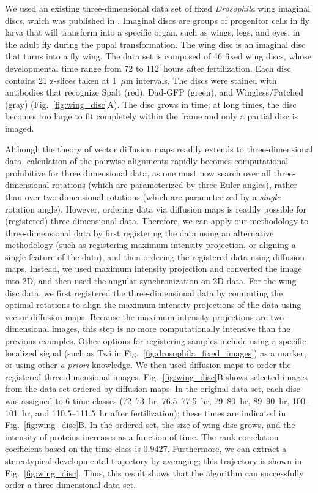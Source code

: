 \documentclass[twocolumn, 10pt]{article}
\newcommand{\fig}[0]{Fig.}
\begin{document}
We used an existing three-dimensional data set of fixed {\em Drosophila} wing imaginal discs, which was published in \citet{hamaratoglu2011dpp}.  
%
Imaginal discs are groups of progenitor cells in fly larva that will transform into a specific organ, such as wings, legs, and eyes, in the adult fly during the pupal transformation. 
%
The wing disc is an imaginal disc that turns into a fly wing. 
%
The data set is composed of 46 fixed wing discs, whose developmental time range from 72 to 112~hours after fertilization. 
%
Each disc contains 21 z-slices taken at 1~$\mu$m intervals. 
%
The discs were stained with antibodies that recognize Spalt (red), Dad-GFP (green), and Wingless/Patched (gray) (\fig~\ref{fig:wing_disc}A). 
%
The disc grows in time; at long times, the disc becomes too large to fit completely within the frame and only a partial disc is imaged. 

Although the theory of vector diffusion maps readily extends to three-dimensional data, calculation of the pairwise alignments rapidly becomes computational prohibitive for three dimensional data, as one must now search over all three-dimensional rotations (which are parameterized by three Euler angles), rather than over two-dimensional rotations (which are parameterized by a {\em single} rotation angle). 
%
However, ordering data via diffusion maps is readily possible for (registered) three-dimensional data. 
%
Therefore, we can apply our methodology to three-dimensional data by first registering the data using an alternative methodology (such as registering maximum intensity projection, or aligning a single feature of the data), and then ordering the registered data using diffusion maps. 
%
Instead, we used maximum intensity projection and converted the image into 2D, and then used the angular synchronization on 2D data. 
%
For the wing disc data, we first registered the three-dimensional data by computing the optimal rotations to align the maximum intensity projections of the data using vector diffusion maps.
%
Because the maximum intensity projections are two-dimensional images, this step is no more computationally intensive than the previous examples. 
%
Other options for registering samples include using a specific localized signal (such as Twi in \fig~\ref{fig:drosophila_fixed_images}) as a marker, or using other {\em a priori} knowledge.
%
We then used diffusion maps to order the registered three-dimensional images. 
%
\fig~\ref{fig:wing_disc}B shows selected images from the data set ordered by diffusion maps. 
%
In the original data set, each disc was assigned to 6 time classes (72--73~hr, 76.5--77.5~hr, 79--80~hr, 89--90~hr, 100--101~hr, and 110.5--111.5~hr after fertilization); these times are indicated in \fig~\ref{fig:wing_disc}B. 
%
In the ordered set, the size of wing disc grows, and the intensity of proteins increases as a function of time. 
%
The rank correlation coefficient based on the time class is 0.9427. 
%
Furthermore, we can extract a stereotypical developmental trajectory by averaging; this trajectory is shown in \fig~\ref{fig:wing_disc}.
%
Thus, this result shows that the algorithm can successfully order a three-dimensional data set.
\end{document}

